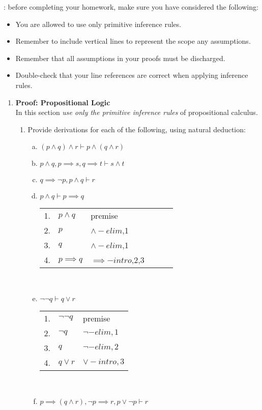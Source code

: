\documentclass{article}
\begin{document}

: before completing your homework,  make sure you have considered the following:
\begin{itemize}
\item You are allowed to use only primitive inference rules.
\item Remember to include vertical lines to represent the scope any assumptions.
\item Remember that all assumptions in your proofs must be discharged.
\item Double-check that your line references are correct when applying inference rules.
\end{itemize}

\bigskip

\begin{enumerate}[\bf I.]

\item \textbf{Proof: Propositional Logic} \\[6pt]
In this section {\em use only the primitive inference rules} of
propositional calculus.
\begin{enumerate}[1.] \setcounter{enumii}{0}
\item Provide derivations for each of the following, using natural
deduction:
\begin{enumerate}[a.]
 \item $(p \land q)\land r\vdash p \land (q \land r)$ \\
 \item $p \land q,p\implies s,q\implies t\vdash s\land t$ \\
 \item $q \implies \neg p,p\land q\vdash r$ \\
 \item $p \land q \vdash p \implies q$ \\
   \begin{tabular}{l ll lll}
     1. & $p \land q$ & premise \\
     2. & $p$         & $\land-elim$,1\\
     3. & $q$         & $\land-elim$,1\\
     4. & $p \implies q$ & $\implies-intro$,2,3 \\
   \end{tabular} \\
 \item $\neg\neg q \vdash q \lor r$ \\
   \begin{tabular}{l ll}
    1. & $\neg\neg q$ & premise \\
    2. & $\neg q$ & $\neg-elim, 1$ \\
    3. & $q$ & $\neg-elim, 2$ \\
    4. & $q \lor r$ & $\lor-intro, 3$\\
   \end{tabular} \\
 \item $p \implies (q \land r), \neg p \implies r, p \lor \neg p \vdash r$ \\
\end{enumerate}
\end{enumerate}


\end{enumerate}
\end{document}
